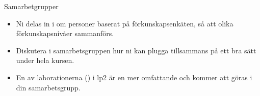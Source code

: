 
\fi

\ifkompendium\else



\begin{SlideExtra}{Samarbetgrupper}\footnotesize
\begin{itemize}
\item Ni delas in i  om  personer baserat på förkunskapsenkäten, så att olika förkunskapsnivåer sammanförs.
\item Diskutera i samarbetsgruppen hur ni kan plugga tillsammans på ett bra sätt under hela kursen.
\item En av laborationerna () i lp2 är en mer omfattande  och kommer att göras i din samarbetsgrupp. \\ \vspace{1em}
\end{itemize}
\end{SlideExtra}



